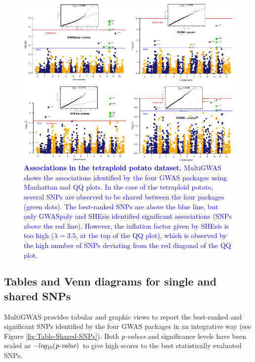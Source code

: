 \documentclass{article}
\begin{document}
\begin{figure}[H]
\begin{centering}
\includegraphics{images/paper-manhattan-QQ-plots}
\par\end{centering}
\caption{\textbf{\textcolor{blue}{Associations in the tetraploid potato dataset.}}\textcolor{blue}{{} MultiGWAS shows the associations identified by the four GWAS packages using Manhattan and QQ plots. In the case of the tetraploid potato, several SNPs are observed to be shared between the four packages (green dots). The best-ranked SNPs are above the blue line, but only GWASpoly and SHEsis identified significant associations (SNPs above the red line). However, the inflation factor given by SHEsis is too high ($\lambda=3.5$, at the top of the QQ plot), which is observed by the high number of SNPs deviating from the red diagonal of the QQ plot. \label{fig:view-qqmanhattan}}}
\end{figure}





\subsection{Tables and Venn diagrams for single and shared SNPs}

MultiGWAS provides tabular and graphic views to report the best-ranked and significant SNPs identified by the four GWAS packages in an integrative way (see Figure \ref{fig:Table-Shared-SNPs}). Both \emph{p-values} and significance levels have been scaled as $-log_{10}({\operatorname{\mathit{p-value}}})$ to give high scores to the best statistically evaluated SNPs.
\end{document}
